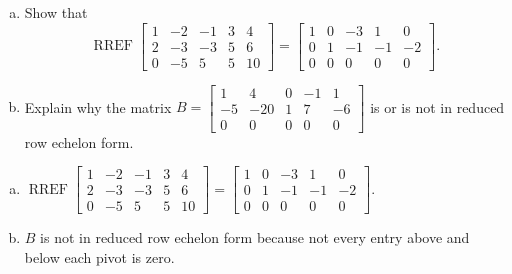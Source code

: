 
\begin{exerciseStatement}

\begin{enumerate}[(a)]
\item Show that \[\operatorname{RREF} \left[\begin{array}{ccccc}
1 & -2 & -1 & 3 & 4 \\
2 & -3 & -3 & 5 & 6 \\
0 & -5 & 5 & 5 & 10
\end{array}\right] = \left[\begin{array}{ccccc}
1 & 0 & -3 & 1 & 0 \\
0 & 1 & -1 & -1 & -2 \\
0 & 0 & 0 & 0 & 0
\end{array}\right] .\]
\item Explain why the matrix \(B= \left[\begin{array}{ccccc}
1 & 4 & 0 & -1 & 1 \\
-5 & -20 & 1 & 7 & -6 \\
0 & 0 & 0 & 0 & 0
\end{array}\right] \) is or is not in reduced row echelon form.
\end{enumerate}
    
\end{exerciseStatement}
    
\begin{exerciseAnswer} 

\begin{enumerate}[(a)]
\item \(\operatorname{RREF} \left[\begin{array}{ccccc}
1 & -2 & -1 & 3 & 4 \\
2 & -3 & -3 & 5 & 6 \\
0 & -5 & 5 & 5 & 10
\end{array}\right] = \left[\begin{array}{ccccc}
1 & 0 & -3 & 1 & 0 \\
0 & 1 & -1 & -1 & -2 \\
0 & 0 & 0 & 0 & 0
\end{array}\right] .\)
\item \(B\) is not in reduced row echelon form because not every entry above and below each pivot is zero. 
\end{enumerate}
    
\end{exerciseAnswer}
    
